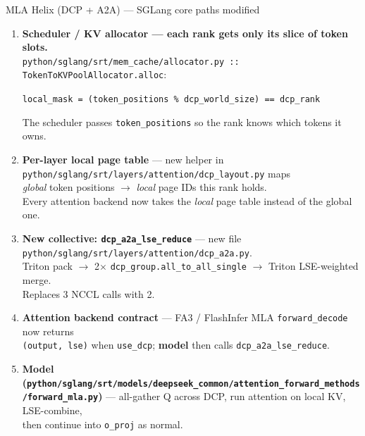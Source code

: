 \documentclass[aspectratio=169,10pt]{beamer}
\begin{document}
\begin{frame}{MLA Helix (DCP + A2A) --- SGLang core paths modified}
  \footnotesize
  \begin{enumerate}\itemsep3pt
    \item \textbf{Scheduler / KV allocator --- each rank gets only its slice of token slots.}\\
          \texttt{python/sglang/srt/mem\_cache/allocator.py :: TokenToKVPoolAllocator.alloc}:
          \vspace{-0.1cm}
          \begin{center}\scriptsize
          \texttt{local\_mask = (token\_positions \% dcp\_world\_size) == dcp\_rank}
          \end{center}
          The scheduler passes \texttt{token\_positions} so the rank knows which tokens it owns.
    \item \textbf{Per-layer local page table} --- new helper in \texttt{python/sglang/srt/layers/attention/dcp\_layout.py} maps\\
          \textit{global} token positions $\to$ \textit{local} page IDs this rank holds.\\
          Every attention backend now takes the \emph{local} page table instead of the global one.
    \item \textbf{New collective: \texttt{dcp\_a2a\_lse\_reduce}} --- new file \texttt{python/sglang/srt/layers/attention/dcp\_a2a.py}.\\
          Triton pack $\to$ 2$\times$ \texttt{dcp\_group.all\_to\_all\_single} $\to$ Triton LSE-weighted merge.\\
          Replaces 3 NCCL calls with 2.
    \item \textbf{Attention backend contract} --- FA3 / FlashInfer MLA \texttt{forward\_decode} now returns\\
          \texttt{(output, lse)} when \texttt{use\_dcp}; \textbf{model} then calls \texttt{dcp\_a2a\_lse\_reduce}.
    \item \textbf{Model (\texttt{python/sglang/srt/models/deepseek\_common/attention\_forward\_methods/forward\_mla.py})} --- all-gather Q across DCP, run attention on local KV, LSE-combine,\\
          then continue into \texttt{o\_proj} as normal.
  \end{enumerate}
\end{frame}
\end{document}
